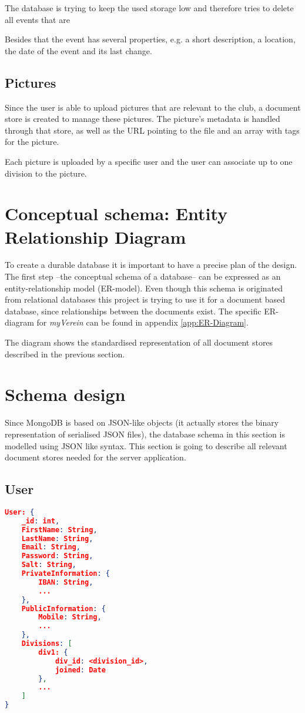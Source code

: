 The database is trying to keep the used storage low and therefore tries to delete all events that are 

Besides that the event has several properties, e.g. a short description, a location, the date of the event and its last change.

\subsection{Pictures}
Since the user is able to upload pictures that are relevant to the club, a document store is created to manage these pictures. The picture's metadata is handled through that store, as well as the URL pointing to the file and an array with tags for the picture.

Each picture is uploaded by a specific user and the user can associate up to one division to the picture.
 
\section{Conceptual schema: Entity Relationship Diagram}
To create a durable database it is important to have a precise plan of the design. The first step --the conceptual schema of a database-- can be expressed as an entity-relationship model (ER-model). Even though this schema is originated from relational databases this project is trying to use it for a document based database, since relationships between the documents exist. The specific ER-diagram for \emph{myVerein} can be found in appendix \vref{app:ER-Diagram}.

The diagram shows the standardised representation of all document stores described in the previous section.

\section{Schema design}
Since MongoDB is based on JSON-like objects (it actually stores the binary representation of serialised JSON files), the database schema in this section is modelled using JSON like syntax. This section is going to describe all relevant document stores needed for the server application.

\subsection{User}
\begin{lstlisting}[language=json, caption=\emph{User}-document store]
User: {
    _id: int,  
    FirstName: String, 
    LastName: String, 
    Email: String,
    Password: String,
    Salt: String,
    PrivateInformation: {
        IBAN: String,
        ...
    },
    PublicInformation: {
        Mobile: String,
        ...
    },
    Divisions: [
        div1: {
            div_id: <division_id>,
            joined: Date
        },
        ...
    ]
}
\end{lstlisting}


